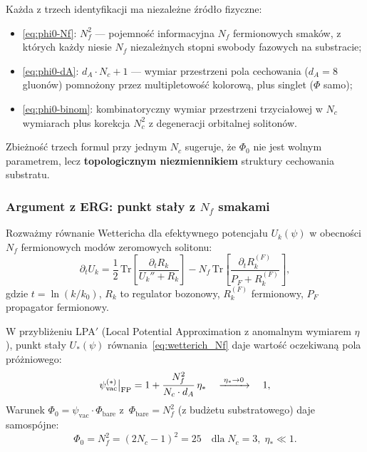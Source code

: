\begin{uwaga}
\label{rem:phi0_three_paths}
Każda z trzech identyfikacji ma niezależne źródło fizyczne:
\begin{itemize}[nosep]
  \item \eqref{eq:phi0-Nf}: $N_f^2$ — pojemność informacyjna
    $N_f$ fermionowych smaków, z których każdy niesie $N_f$
    niezależnych stopni swobody fazowych na substracie;
  \item \eqref{eq:phi0-dA}: $d_A \cdot N_c + 1$ — wymiar przestrzeni
    pola cechowania ($d_A = 8$ gluonów) pomnożony przez
    multipletowość kolorową, plus singlet ($\Phi$ samo);
  \item \eqref{eq:phi0-binom}: kombinatoryczny wymiar przestrzeni
    trzyciałowej w $N_c$ wymiarach plus korekcja $N_c^2$
    z degeneracji orbitalnej solitonów.
\end{itemize}
Zbieżność trzech formul przy jednym $N_c$ sugeruje, że
$\Phi_0$ nie jest wolnym parametrem, lecz \textbf{topologicznym
niezmiennikiem} struktury cechowania substratu.
\end{uwaga}

\subsubsection{Argument z ERG: punkt stały z $N_f$ smakami}
\label{sssec:phi0_erg}

Rozważmy równanie Wettericha dla efektywnego potencjału
$U_k(\psi)$ w obecności $N_f$ fermionowych modów zeromowych
solitonu:
\begin{equation}
  \partial_t U_k = \frac{1}{2}\,\mathrm{Tr}\!\left[
    \frac{\partial_t R_k}{U_k'' + R_k}
  \right]
  - N_f\,\mathrm{Tr}\!\left[
    \frac{\partial_t R_k^{(F)}}{P_F + R_k^{(F)}}
  \right],
  \label{eq:wetterich_Nf}
\end{equation}
gdzie $t = \ln(k/k_0)$, $R_k$ to regulator bozonowy,
$R_k^{(F)}$ fermionowy, $P_F$ propagator fermionowy.

\begin{propozycja}
\label{prop:phi0_erg_selfconsistent}

W przybliżeniu LPA$'$ (Local Potential Approximation z
anomalnym wymiarem $\eta$), punkt stały
$U_*(\psi)$ równania~\eqref{eq:wetterich_Nf}
daje wartość oczekiwaną pola próżniowego:
\begin{equation}
  \psi_{\rm vac}^{(*)}\big|_{\rm FP}
  = 1 + \frac{N_f^2}{N_c \cdot d_A}\,\eta_*
  \quad\xrightarrow{\;\eta_* \to 0\;}\quad 1,
  \label{eq:psi_vac_FP}
\end{equation}
Warunek $\Phi_0 = \psi_\mathrm{vac} \cdot \Phi_\mathrm{bare}$
z~$\Phi_\mathrm{bare} = N_f^2$ (z budżetu substratowego)
daje samospójne:
\begin{equation}
  \boxed{
    \Phi_0 = N_f^2 = (2N_c - 1)^2 = 25
    \quad \text{dla}\; N_c = 3,\; \eta_* \ll 1.
  }
  \label{eq:phi0_erg_result}
\end{equation}
\end{propozycja}

